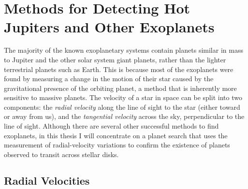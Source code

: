 \section{Methods for Detecting Hot Jupiters and Other Exoplanets}
\label{cha:intro:sec:methods}

The majority of the known exoplanetary systems contain planets similar in mass to Jupiter and the other solar system giant planets, rather than the lighter terrestrial planets such as Earth.
This is because most of the exoplanets were found by measuring a change in the motion of their star caused by the gravitational presence of the orbiting planet, a method that is inherently more sensitive to massive planets.
The velocity of a star in space can be split into two components: the {\it radial velocity} along the line of sight to the star (either toward or away from us), and the {\it tangential velocity} across the sky, perpendicular to the line of sight.
Although there are several other successful methods to find exoplanets, in this thesis I will concentrate on a planet search that uses the measurement of radial-velocity variations to confirm the existence of planets observed to transit across stellar disks.

\subsection{Radial Velocities}
\label{cha:intro:sec:methods:sub:rv}

